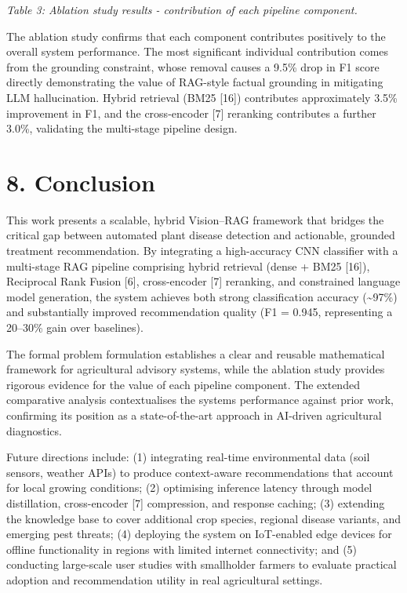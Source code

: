 \emph{Table 3: Ablation study results - contribution of each pipeline
component.}

The ablation study confirms that each component contributes positively
to the overall system performance. The most significant individual
contribution comes from the grounding constraint, whose removal causes a
9.5\% drop in F1 score directly demonstrating the value of RAG-style
factual grounding in mitigating LLM hallucination. Hybrid retrieval
(BM25 {[}16{]}) contributes approximately 3.5\% improvement in F1, and
the cross-encoder {[}7{]} reranking contributes a further 3.0\%,
validating the multi-stage pipeline design.

\section*{8. Conclusion}\label{conclusion}

This work presents a scalable, hybrid Vision--RAG framework that bridges
the critical gap between automated plant disease detection and
actionable, grounded treatment recommendation. By integrating a
high-accuracy CNN classifier with a multi-stage RAG pipeline comprising
hybrid retrieval (dense + BM25 {[}16{]}), Reciprocal Rank Fusion
{[}6{]}, cross-encoder {[}7{]} reranking, and constrained language model
generation, the system achieves both strong classification accuracy
(\textasciitilde97\%) and substantially improved recommendation quality
(F1 = 0.945, representing a 20--30\% gain over baselines).

The formal problem formulation establishes a clear and reusable
mathematical framework for agricultural advisory systems, while the
ablation study provides rigorous evidence for the value of each pipeline
component. The extended comparative analysis contextualises the
system\textquotesingle s performance against prior work, confirming its
position as a state-of-the-art approach in AI-driven agricultural
diagnostics.

Future directions include: (1) integrating real-time environmental data
(soil sensors, weather APIs) to produce context-aware recommendations
that account for local growing conditions; (2) optimising inference
latency through model distillation, cross-encoder {[}7{]} compression,
and response caching; (3) extending the knowledge base to cover
additional crop species, regional disease variants, and emerging pest
threats; (4) deploying the system on IoT-enabled edge devices for
offline functionality in regions with limited internet connectivity; and
(5) conducting large-scale user studies with smallholder farmers to
evaluate practical adoption and recommendation utility in real
agricultural settings.

